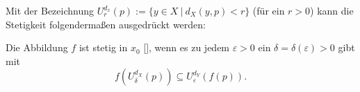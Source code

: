 Mit der Bezeichnung $U^{d_x}_r (p) := \{y \in X \ | \ d_X(y, p) < r \}$ (für ein $r > 0$) kann die Stetigkeit folgendermaßen ausgedrückt werden:

Die Abbildung $f$ ist stetig in $x_0$ [], wenn es zu jedem $\varepsilon > 0$ ein $\delta = \delta(\varepsilon) > 0$ gibt mit
$$f(U^{d_X}_\delta(p)) \subseteq U^{d_Y}_\varepsilon(f(p)).$$